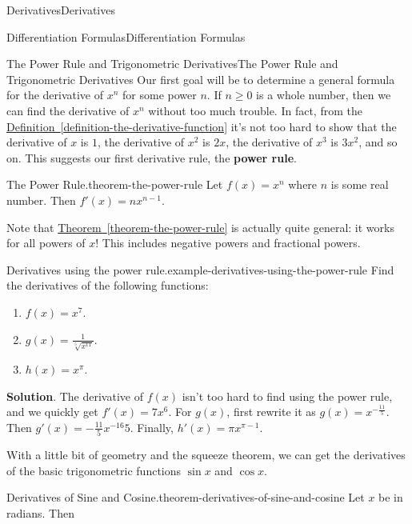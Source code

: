 \documentclass[10pt,]{book}
\newcommand{\terminology}[1]{\textbf{#1}}
\numberwithin{equation}{section}
\begin{document}
\begin{chapterptx}{Derivatives}{}{Derivatives}{}{}
\begin{sectionptx}{Differentiation Formulas}{}{Differentiation Formulas}{}{}
\begin{subsectionptx}{The Power Rule and Trigonometric Derivatives}{}{The Power Rule and Trigonometric Derivatives}{}{}
Our first goal will be to determine a general formula for the derivative of \(x^{n}\) for some power \(n\). If \(n\geq0\) is a whole number, then we can find the derivative of \(x^{n}\) without too much trouble. In fact, from the \hyperref[definition-the-derivative-function]{Definition~\ref{definition-the-derivative-function}} it's not too hard to show that the derivative of \(x\) is \(1\), the derivative of \(x^{2}\) is \(2x\), the derivative of \(x^{3}\) is \(3x^{2}\), and so on. This suggests our first derivative rule, the \terminology{power rule}.%
\begin{theorem}{The Power Rule.}{}{theorem-the-power-rule}%
\hypertarget{p-125}{}%
Let \(f(x) = x^{n}\) where \(n\) is some real number. Then \(f'(x) = nx^{n-1}\).%
\end{theorem}
\hypertarget{p-126}{}%
Note that \hyperref[theorem-the-power-rule]{Theorem~\ref{theorem-the-power-rule}} is actually quite general: it works for all powers of \(x\)! This includes negative powers and fractional powers.%
\begin{example}{Derivatives using the power rule.}{example-derivatives-using-the-power-rule}%
\hypertarget{p-127}{}%
Find the derivatives of the following functions: \leavevmode%
\begin{enumerate}
\item\hypertarget{li-5}{}\(f(x) = x^{7}\).%
\item\hypertarget{li-6}{}\(g(x) = \frac{1}{\sqrt[5]{x^{11}}}\).%
\item\hypertarget{li-7}{}\(h(x) = x^{\pi}\).%
\end{enumerate}
%
\par\smallskip%
\noindent\textbf{Solution}.\hypertarget{solution-26}{}\quad%
\hypertarget{p-128}{}%
The derivative of \(f(x)\) isn't too hard to find using the power rule, and we quickly get \(f'(x) = 7x^{6}\). For \(g(x)\), first rewrite it as \(g(x) = x^{-\frac{11}{5}}\). Then \(g'(x) = -\frac{11}{5}x^{-16}{5}\). Finally, \(h'(x) = \pi x^{\pi-1}\).%
\end{example}
\hypertarget{p-129}{}%
With a little bit of geometry and the squeeze theorem, we can get the derivatives of the basic trigonometric functions \(\sin x\) and \(\cos x\).%
\begin{theorem}{Derivatives of Sine and Cosine.}{}{theorem-derivatives-of-sine-and-cosine}%
\hypertarget{p-130}{}%
Let \(x\) be in radians. Then%
\begin{equation*}

\end{equation*}
\end{theorem}
\end{subsectionptx}
\end{sectionptx}
\end{chapterptx}
\end{document}
